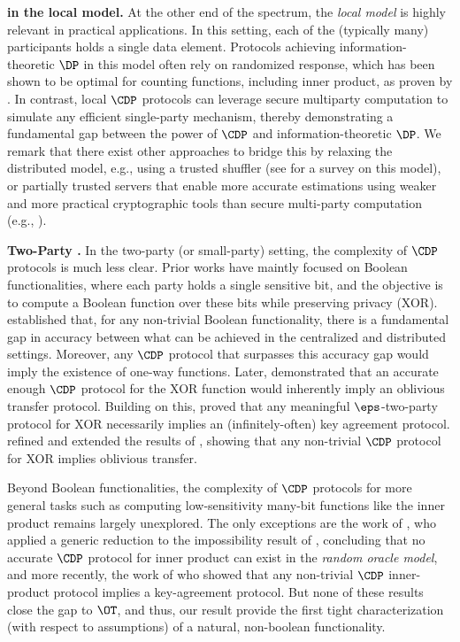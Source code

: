 \textbf{\CDP in the local model.} At the other end of the spectrum, the \emph{local model} is highly relevant in practical applications. In this setting, each of the (typically many) participants holds a single data element. Protocols achieving information-theoretic $\DP$ in this model often rely on randomized response, which has been shown to be optimal for counting functions, including inner product, as proven by \cite{chan2012optimal}. In contrast, local $\CDP$ protocols can leverage secure multiparty computation to simulate any efficient single-party mechanism, thereby demonstrating a fundamental gap between the power of $\CDP$ and information-theoretic $\DP$. We remark that there exist other approaches to bridge this by relaxing the distributed model, e.g., using a trusted shuffler \cite{BittauEMMRLRKTS17,CheuSUZZ19} (see \cite{CheuSurvey22} for a survey on this model), or partially trusted servers that enable more accurate estimations using weaker and more practical cryptographic tools than secure multi-party computation (e.g., \cite{BangaloreCV24,DamgardKNOP24,BohlerK20}).

\textbf{Two-Party \CDP.} In the two-party (or small-party) setting, the complexity of $\CDP$ protocols is much less clear. Prior works have maintly focused on Boolean functionalities, where each party holds a single sensitive bit, and the objective is to compute a Boolean function over these bits while preserving privacy (\eg XOR). \cite{GMPS13} established that, for any non-trivial Boolean functionality, there is a fundamental gap in accuracy between what can be achieved in the centralized and distributed settings. Moreover, any $\CDP$ protocol that surpasses this accuracy gap would imply the existence of one-way functions. Later, \cite{GKMPS16} demonstrated that an accurate enough $\CDP$ protocol for the XOR function would inherently imply an oblivious transfer protocol. Building on this, \cite{HNOSS20} proved that any meaningful $\eps$-\CDP two-party protocol for XOR necessarily implies an (infinitely-often) key agreement protocol. \cite{HMSS19} refined and extended the results of \cite{GKMPS16,HNOSS20}, showing that any non-trivial $\CDP$ protocol for XOR implies oblivious transfer.

Beyond Boolean functionalities, the complexity of $\CDP$ protocols for more general tasks such as computing low-sensitivity many-bit functions like the inner product remains largely unexplored. The only exceptions are the work of \cite{haitner2016limits}, who applied a generic reduction to the impossibility result of \cite{MPRV09}, concluding that no accurate $\CDP$ protocol for inner product can exist in the \textit{random oracle model}, and more recently, the work of \cite{HaitnerMST22} who showed that any non-trivial $\CDP$ inner-product protocol implies a key-agreement protocol. But none of these results close the gap to $\OT$, and thus, our result provide the first tight characterization (with respect to assumptions) of a natural, non-boolean functionality.